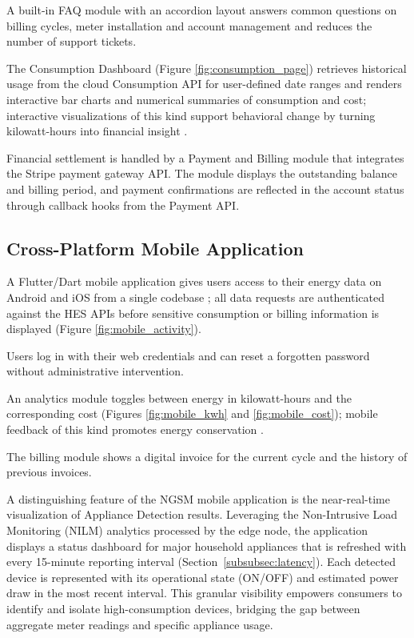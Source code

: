 \documentclass[fleqn,10pt]{wlscirep}
\begin{document}
A built-in FAQ module with an accordion layout answers common questions on billing cycles, meter installation and account management and reduces the number of support tickets.

The Consumption Dashboard (Figure \ref{fig:consumption_page}) retrieves historical usage from the cloud Consumption API for user-defined date ranges and renders interactive bar charts and numerical summaries of consumption and cost; interactive visualizations of this kind support behavioral change by turning kilowatt-hours into financial insight \cite{mti3030056}.


Financial settlement is handled by a Payment and Billing module that integrates the Stripe payment gateway API. The module displays the outstanding balance and billing period, and payment confirmations are reflected in the account status through callback hooks from the Payment API.

\subsection{Cross-Platform Mobile Application}
\label{subsec:mobileapp}

A Flutter/Dart mobile application gives users access to their energy data on Android and iOS from a single codebase \cite{Gülcüoğlu2021}; all data requests are authenticated against the HES APIs before sensitive consumption or billing information is displayed (Figure \ref{fig:mobile_activity}).


Users log in with their web credentials and can reset a forgotten password without administrative intervention.

An analytics module toggles between energy in kilowatt-hours and the corresponding cost (Figures \ref{fig:mobile_kwh} and \ref{fig:mobile_cost}); mobile feedback of this kind promotes energy conservation \cite{chatzigeorgiou2021}.



The billing module shows a digital invoice for the current cycle and the history of previous invoices.

A distinguishing feature of the NGSM mobile application is the near-real-time visualization of Appliance Detection results. Leveraging the Non-Intrusive Load Monitoring (NILM) analytics processed by the edge node, the application displays a status dashboard for major household appliances that is refreshed with every 15-minute reporting interval (Section~\ref{subsubsec:latency}). Each detected device is represented with its operational state (ON/OFF) and estimated power draw in the most recent interval. This granular visibility empowers consumers to identify and isolate high-consumption devices, bridging the gap between aggregate meter readings and specific appliance usage.
\end{document}
